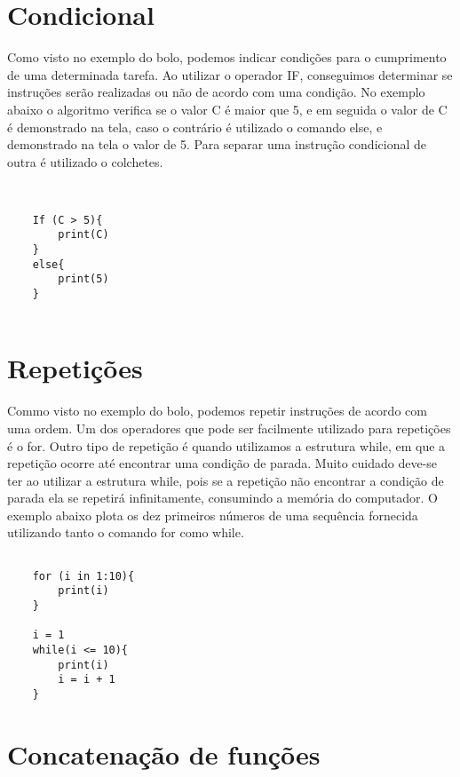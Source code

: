 \section{Condicional} 

Como visto no exemplo do bolo, podemos indicar condições para o cumprimento de uma determinada tarefa. Ao utilizar o operador IF, conseguimos determinar se instruções serão realizadas ou não de acordo com uma condição. No exemplo abaixo o algoritmo verifica se o valor C é maior que 5, e em seguida o valor de C é demonstrado na tela, caso o contrário é utilizado o comando else, e demonstrado na tela o valor de 5. Para separar uma instrução condicional de outra é utilizado o colchetes.

\begin{scriptsize}
	\estiloR
	\begin{lstlisting}[caption={Criação de um vetor em R}, label=lst:rcode]
	
	
	If (C > 5){
		print(C)
	}
	else{
		print(5)
	}
	
	\end{lstlisting}
\end{scriptsize}

\section{Repetições}

Commo visto no exemplo do bolo, podemos repetir instruções de acordo com uma ordem. Um dos operadores que pode ser facilmente utilizado para repetições é o for. Outro tipo de repetição é quando utilizamos a estrutura while, em que a repetição ocorre até encontrar uma condição de parada. Muito cuidado deve-se ter ao utilizar a estrutura while, pois se a repetição não encontrar a condição de parada ela se repetirá infinitamente, consumindo a memória do computador. O exemplo abaixo plota os dez primeiros números de uma sequência fornecida utilizando tanto o comando for como while. 

\begin{scriptsize}
	\estiloR
	\begin{lstlisting}[caption={Criação de um vetor em R}, label=lst:rcode]

	for (i in 1:10){
		print(i)
	}
	
	i = 1
	while(i <= 10){
		print(i)
		i = i + 1
	}
	\end{lstlisting}
\end{scriptsize}

\section{Concatenação de funções} 

